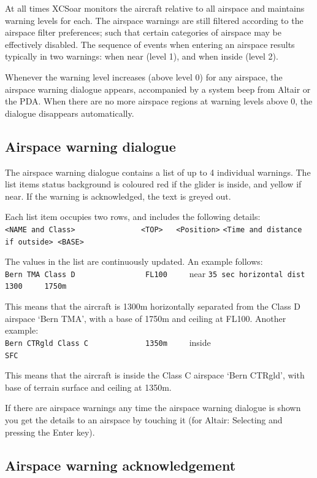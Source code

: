At all times XCSoar monitors the aircraft relative to all airspace and
maintains warning levels for each.  The airspace warnings are still
filtered according to the airspace filter preferences; such that
certain categories of airspace may be effectively disabled.
The sequence of events when entering an airspace results typically
in two warnings: when near (level 1), and when inside (level 2).

Whenever the warning level increases (above level 0) for any airspace,
the airspace warning dialogue appears, accompanied by a system beep from
Altair or the PDA.  When there are no more airspace regions at warning
levels above 0, the dialogue disappears automatically.

\subsection*{Airspace warning dialogue}

The airspace warning dialogue contains a list of up to 4 individual
warnings.  The list items status background is coloured red if the glider is
inside, and yellow if near.  If the warning is acknowledged, the
text is greyed out.

Each list item occupies two rows, and includes the following details:\\
\verb+<NAME and Class>               <TOP>   <Position>+
\verb+<Time and distance if outside> <BASE>+

The values in the list are continuously updated. 
An example follows:\\
\verb+Bern TMA Class D                FL100     +\colorbox{AirspaceYellow}{near}
\verb+35 sec horizontal dist 1300     1750m+

This means that the aircraft is 1300m horizontally separated from the Class D airspace
`Bern TMA', with a base of 1750m and ceiling at FL100.
Another example:\\
\verb+Bern CTRgld Class C             1350m     +\colorbox{AirspaceRed}{inside}
\verb+                                SFC+

This means that the aircraft is inside the Class C airspace `Bern
CTRgld', with base of terrain surface and ceiling at 1350m.

If there are airspace warnings any time the airspace warning dialogue is shown 
you get the details to an airspace by touching it (for Altair: Selecting and 
pressing the Enter key).

\subsection*{Airspace warning acknowledgement}

